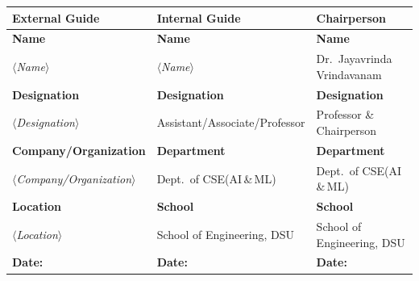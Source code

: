 \documentclass[12pt, a4paper]{report}
\begin{document}
\noindent
\begin{tabular}{|C{0.31\textwidth}|C{0.31\textwidth}|C{0.31\textwidth}|}
\hline
\rule{0pt}{12pt}\textbf{External Guide} &
  \textbf{Internal Guide} &
  \textbf{Chairperson} \\[2pt]
\hline
\rule{0pt}{10pt}\textbf{Name} & \textbf{Name} & \textbf{Name} \\[2pt]
$\langle$\textit{Name}$\rangle$ &
  $\langle$\textit{Name}$\rangle$ &
  Dr.\ Jayavrinda Vrindavanam \\[4pt]
\hline
\rule{0pt}{10pt}\textbf{Designation} & \textbf{Designation} & \textbf{Designation} \\[2pt]
$\langle$\textit{Designation}$\rangle$ &
  Assistant/Associate/Professor &
  Professor \& Chairperson \\[4pt]
\hline
\rule{0pt}{10pt}\textbf{Company/Organization} &
  \textbf{Department} &
  \textbf{Department} \\[2pt]
$\langle$\textit{Company/Organization}$\rangle$ &
  Dept.\ of CSE(AI\,\&\,ML) &
  Dept.\ of CSE(AI\,\&\,ML) \\[4pt]
\hline
\rule{0pt}{10pt}\textbf{Location} & \textbf{School} & \textbf{School} \\[2pt]
$\langle$\textit{Location}$\rangle$ &
  School of Engineering, DSU &
  School of Engineering, DSU \\[4pt]
\hline
\rule{0pt}{10pt}\textbf{Date:} & \textbf{Date:} & \textbf{Date:} \\[22pt]
\hline
\end{tabular}

\restoregeometry
\clearpage
\end{document}

